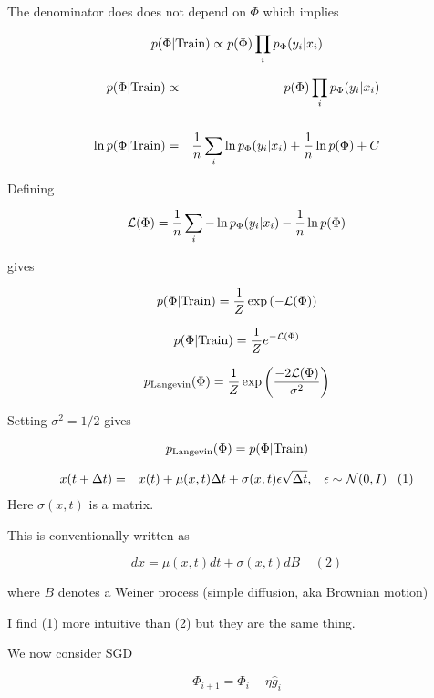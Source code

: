 {\vfill
The denominator does does not depend on $\Phi$ which implies

$$p(\Phi|\mathrm{Train}) \propto p(\Phi)\prod_i p_\Phi(y_i|x_i)$$



{\huge
\begin{eqnarray*}
p(\Phi|\mathrm{Train}) & \propto & p(\Phi)\prod_i p_\Phi(y_i|x_i) \\
\\
\ln p(\Phi|\mathrm{Train}) & = & \frac{1}{n} \sum_i \ln p_\Phi(y_i|x_i) + \frac{1}{n}\ln p(\Phi) + C
\end{eqnarray*}

Defining

$${\cal L}(\Phi) = \frac{1}{n} \sum_i -\ln p_\Phi(y_i|x_i) - \frac{1}{n} \ln p(\Phi)$$

gives

{\color{red} $$p(\Phi|\mathrm{Train}) = \frac{1}{Z}\exp\left(-{\cal L}(\Phi)\right)$$}
}







$$p(\Phi|\mathrm{Train}) = \frac{1}{Z}e^{-{\cal L}(\Phi)}$$

\vfill
$$p_{\mathrm{Langevin}}(\Phi) = \frac{1}{Z}\exp\left(\frac{-2{\cal L}(\Phi)}{\sigma^2}\right)$$

\vfill
Setting $\sigma^2 = 1/2$ gives

\vfill
$$p_{\mathrm{Langevin}}(\Phi) = p(\Phi|\mathrm{Train})$$


{\huge
\begin{eqnarray*}
x(t + \Delta t) &  =  & x(t) + \mu(x,t)\Delta t + \sigma(x,t)\epsilon \sqrt{\Delta t},\;\;\;\epsilon \sim {\cal N}(0,I)\;\;\;(1)
 \end{eqnarray*}
}
\vfill
Here $\sigma(x,t)$ is a matrix.

\vfill
This is conventionally written as

$$dx = \mu(x,t)dt + \sigma(x,t)dB\;\;\;\;(2)$$

\vfill
where $B$ denotes a Weiner process (simple diffusion, aka Brownian motion)

\vfill
I find (1) more intuitive than (2) but they are the same thing.


\vfill
We now consider SGD

$$\Phi_{i+1} = \Phi_i - \eta\hat{g}_i$$

}
